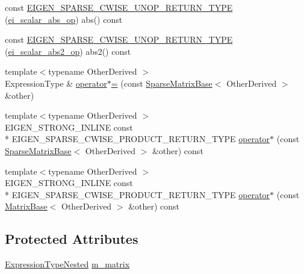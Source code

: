 \begin{DoxyCompactItemize}
\item 
const \hyperlink{class_sparse_cwise_ad633ff35a7b05f6c110fba689e43ec7c}{E\-I\-G\-E\-N\-\_\-\-S\-P\-A\-R\-S\-E\-\_\-\-C\-W\-I\-S\-E\-\_\-\-U\-N\-O\-P\-\_\-\-R\-E\-T\-U\-R\-N\-\_\-\-T\-Y\-P\-E} (\hyperlink{structei__scalar__abs__op}{ei\-\_\-scalar\-\_\-abs\-\_\-op}) abs() const 
\item 
const \hyperlink{class_sparse_cwise_ac9c3b15c511d38f153e711b4d80376e7}{E\-I\-G\-E\-N\-\_\-\-S\-P\-A\-R\-S\-E\-\_\-\-C\-W\-I\-S\-E\-\_\-\-U\-N\-O\-P\-\_\-\-R\-E\-T\-U\-R\-N\-\_\-\-T\-Y\-P\-E} (\hyperlink{structei__scalar__abs2__op}{ei\-\_\-scalar\-\_\-abs2\-\_\-op}) abs2() const 
\item 
{\footnotesize template$<$typename Other\-Derived $>$ }\\Expression\-Type \& \hyperlink{class_sparse_cwise_a1f5c5c75c1d368900a2297bddcf63e85}{operator$\ast$=} (const \hyperlink{class_sparse_matrix_base}{Sparse\-Matrix\-Base}$<$ Other\-Derived $>$ \&other)
\item 
{\footnotesize template$<$typename Other\-Derived $>$ }\\E\-I\-G\-E\-N\-\_\-\-S\-T\-R\-O\-N\-G\-\_\-\-I\-N\-L\-I\-N\-E const \\*
E\-I\-G\-E\-N\-\_\-\-S\-P\-A\-R\-S\-E\-\_\-\-C\-W\-I\-S\-E\-\_\-\-P\-R\-O\-D\-U\-C\-T\-\_\-\-R\-E\-T\-U\-R\-N\-\_\-\-T\-Y\-P\-E \hyperlink{class_sparse_cwise_a2b9abba91ceccbbce4efb32ea8c76af6}{operator$\ast$} (const \hyperlink{class_sparse_matrix_base}{Sparse\-Matrix\-Base}$<$ Other\-Derived $>$ \&other) const 
\item 
{\footnotesize template$<$typename Other\-Derived $>$ }\\E\-I\-G\-E\-N\-\_\-\-S\-T\-R\-O\-N\-G\-\_\-\-I\-N\-L\-I\-N\-E const \\*
E\-I\-G\-E\-N\-\_\-\-S\-P\-A\-R\-S\-E\-\_\-\-C\-W\-I\-S\-E\-\_\-\-P\-R\-O\-D\-U\-C\-T\-\_\-\-R\-E\-T\-U\-R\-N\-\_\-\-T\-Y\-P\-E \hyperlink{class_sparse_cwise_ac4b4f5b0c0bf877dfe30036805bfba1b}{operator$\ast$} (const \hyperlink{class_matrix_base}{Matrix\-Base}$<$ Other\-Derived $>$ \&other) const 
\end{DoxyCompactItemize}
\subsection*{Protected Attributes}
\begin{DoxyCompactItemize}
\item 
\hyperlink{class_sparse_cwise_ae603d2da5a5b74a3adb93a21b4aa8c1e}{Expression\-Type\-Nested} \hyperlink{class_sparse_cwise_a64c10cb80091ee64fe3a4392c7bc6d25}{m\-\_\-matrix}
\end{DoxyCompactItemize}


